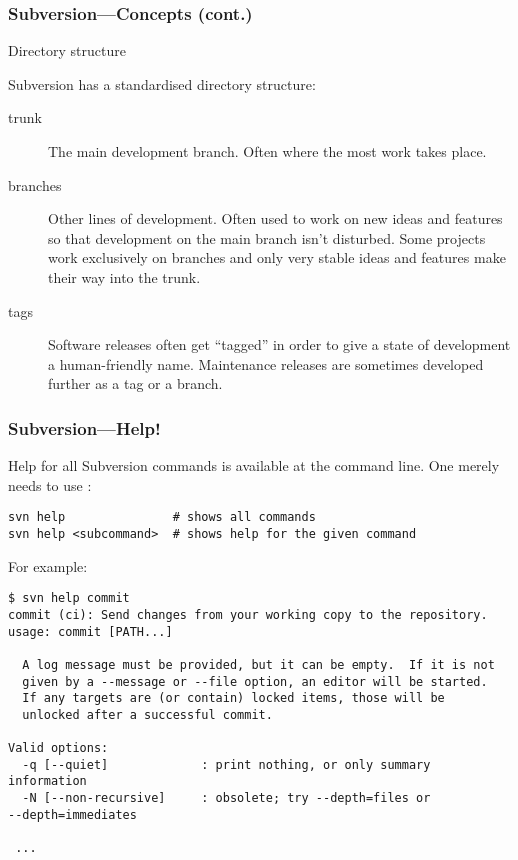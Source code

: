 \begin{frame}
\frametitle{Subversion---Concepts (cont.)}
{\large \alert{Directory structure}}

Subversion has a standardised directory structure:
\begin{description}
\item[trunk] The main development branch.  Often where the most work takes
    place.
\item[branches] Other lines of development.  Often used to work on new ideas
    and features so that development on the main branch isn't disturbed.
    Some projects work exclusively on branches and only very stable ideas
    and features make their way into the trunk.
\item[tags] Software releases often get \enquote{tagged} in order to give a
    state of development a human-friendly name.  Maintenance releases are
    sometimes developed further as a tag or a branch.
\end{description}
\end{frame}


\begin{frame}[fragile]
\frametitle{Subversion---Help!}
\linuxframe

Help for all Subversion commands is available at the command line.  One
merely needs to use :
\begin{lstlisting}
svn help               # shows all commands
svn help <subcommand>  # shows help for the given command
\end{lstlisting}

For example:
\begin{lstlisting}[basicstyle=\tiny\ttfamily\color{black}]
$ svn help commit
commit (ci): Send changes from your working copy to the repository.
usage: commit [PATH...]

  A log message must be provided, but it can be empty.  If it is not
  given by a --message or --file option, an editor will be started.
  If any targets are (or contain) locked items, those will be
  unlocked after a successful commit.

Valid options:
  -q [--quiet]             : print nothing, or only summary information
  -N [--non-recursive]     : obsolete; try --depth=files or
--depth=immediates

 ...
\end{lstlisting}
\end{frame}

